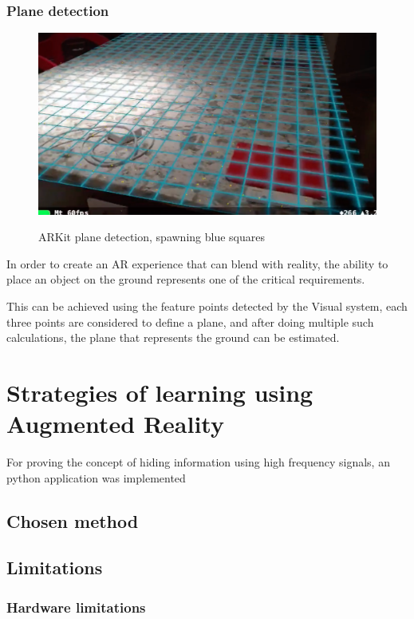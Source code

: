\documentclass[12 pct]{report}
\begin{document}
\subsection*{Plane detection}
\begin{figure}[H]
\includegraphics[width=1\textwidth]{plane-detection}
\centering
\label{fig:plane-detection}
\caption{ARKit plane detection, spawning blue squares}
\end{figure}

In order to create an AR experience that can blend with reality, the ability to place an object on the ground represents one of the critical requirements. 

This can be achieved using the feature points detected by the Visual system, each three points are considered to define a plane, and after doing multiple such calculations, the plane that represents the ground can be estimated.










\chapter{Strategies of learning using Augmented Reality}
For proving the concept of hiding information using high frequency signals, an python application was implemented
\section{Chosen method}


\section{Limitations}
\subsection{Hardware limitations}
\end{document}

